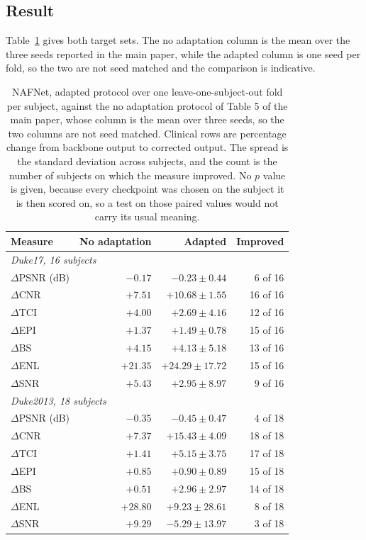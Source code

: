 \subsection{Result}
Table~\ref{tab:supp_adapted} gives both target sets. The no adaptation column is the mean over the
three seeds reported in the main paper, while the adapted column is one seed per fold, so the two are
not seed matched and the comparison is indicative.

\begin{table}[!tb]
\centering
\caption{NAFNet, adapted protocol over one leave-one-subject-out fold per subject, against the no
adaptation protocol of Table 5 of the main paper, whose column is the mean over three seeds, so the
two columns are not seed matched. Clinical rows are percentage
change from backbone output to corrected output. The spread is the standard deviation across
subjects, and the count is the number of subjects on which the measure improved. No $p$ value is
given, because every checkpoint was chosen on the subject it is then scored on, so a test on those
paired values would not carry its usual meaning.}
\label{tab:supp_adapted}
\footnotesize
\begin{tabular}{lrrr}
\toprule
Measure & No adaptation & Adapted & Improved \\
\midrule
\multicolumn{4}{l}{\textit{Duke17, 16 subjects}} \\
$\Delta$PSNR (dB) & $-0.17$ & $-0.23 \pm 0.44$ & 6 of 16 \\
$\Delta$CNR & $+7.51$ & $+10.68 \pm 1.55$ & 16 of 16 \\
$\Delta$TCI & $+4.00$ & $+2.69 \pm 4.16$ & 12 of 16 \\
$\Delta$EPI & $+1.37$ & $+1.49 \pm 0.78$ & 15 of 16 \\
$\Delta$BS & $+4.15$ & $+4.13 \pm 5.18$ & 13 of 16 \\
$\Delta$ENL & $+21.35$ & $+24.29 \pm 17.72$ & 15 of 16 \\
$\Delta$SNR & $+5.43$ & $+2.95 \pm 8.97$ & 9 of 16 \\
\midrule
\multicolumn{4}{l}{\textit{Duke2013, 18 subjects}} \\
$\Delta$PSNR (dB) & $-0.35$ & $-0.45 \pm 0.47$ & 4 of 18 \\
$\Delta$CNR & $+7.37$ & $+15.43 \pm 4.09$ & 18 of 18 \\
$\Delta$TCI & $+1.41$ & $+5.15 \pm 3.75$ & 17 of 18 \\
$\Delta$EPI & $+0.85$ & $+0.90 \pm 0.89$ & 15 of 18 \\
$\Delta$BS & $+0.51$ & $+2.96 \pm 2.97$ & 14 of 18 \\
$\Delta$ENL & $+28.80$ & $+9.23 \pm 28.61$ & 8 of 18 \\
$\Delta$SNR & $+9.29$ & $-5.29 \pm 13.97$ & 3 of 18 \\
\bottomrule
\end{tabular}
\end{table}

